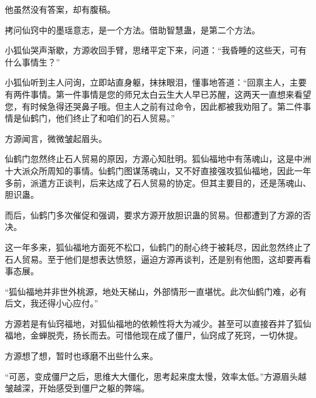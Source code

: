 \begin{this_body}
他虽然没有答案，却有腹稿。

拷问仙窍中的墨瑶意志，是一个方法。借助智慧蛊，是第二个方法。

小狐仙哭声渐歇，方源收回手臂，思绪平定下来，问道：“我昏睡的这些天，可有什么事情生？”

小狐仙听到主人问询，立即站直身躯，抹抹眼泪，懂事地答道：“回禀主人，主要有两件事情。第一件事情是您的师兄太白云生大人早已苏醒，这两天一直想来看望您，有时候急得还哭鼻子哦。但主人之前有过命令，因此都被我劝阻了。第二件事情是仙鹤门，他们终止了和咱们的石人贸易。”

方源闻言，微微皱起眉头。

仙鹤门忽然终止石人贸易的原因，方源心知肚明。狐仙福地中有荡魂山，这是中洲十大派众所周知的事情。仙鹤门图谋荡魂山，又不好直接强攻狐仙福地，因此一年多前，派遣方正谈判，后来达成了石人贸易的协定。但其主要目的，还是荡魂山、胆识蛊。

而后，仙鹤门多次催促和强调，要求方源开放胆识蛊的贸易。但都遭到了方源的否决。

这一年多来，狐仙福地方面死不松口，仙鹤门的耐心终于被耗尽，因此忽然终止了石人贸易。至于他们是想表达愤怒，逼迫方源再谈判，还是别有他图，这却要再看事态展。

“狐仙福地并非世外桃源，地处天梯山，外部情形一直堪忧。此次仙鹤门难，必有后文，我还得小心应付。”

方源若是有仙窍福地，对狐仙福地的依赖性将大为减少。甚至可以直接吞并了狐仙福地，金蝉脱壳，扬长而去。可惜他现在成了僵尸，仙窍成了死窍，一切休提。

方源想了想，暂时也琢磨不出些什么来。

“可恶，变成僵尸之后，思维大大僵化，思考起来度太慢，效率太低。”方源眉头越皱越深，开始感受到僵尸之躯的弊端。

\end{this_body}

